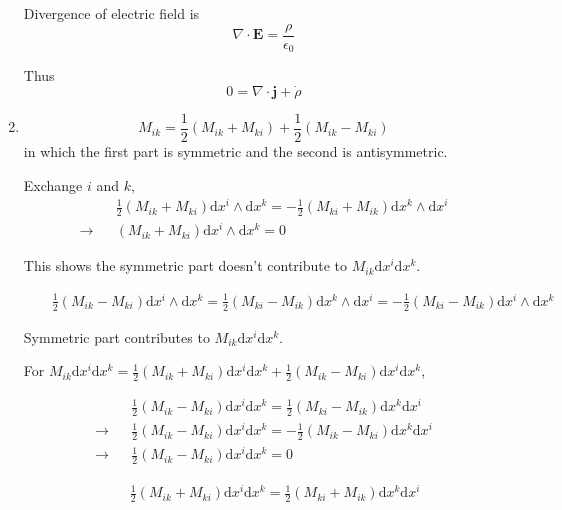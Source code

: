 \documentclass[12pt,a4paper]{article}
\begin{document}
\begin{enumerate}
Divergence of electric field is
\begin{equation}
	\nabla\cdot \mathbf E = \frac \rho {\epsilon_0}
\end{equation}

Thus
\begin{equation}
	0 = \nabla\cdot \mathbf j + \dot{\rho}
\end{equation}


\item

\begin{equation}
	M_{ik} = \frac{1}{2}(M_{ik} + M_{ki}) + \frac{1}{2}(M_{ik} - M_{ki})
\end{equation}
in which the first part is symmetric and the second is antisymmetric.

Exchange $i$ and $k$,
\begin{eqnarray}
	&&\frac12 (M_{ik} + M_{ki})\mathrm dx^i\wedge \mathrm dx^k
	= -\frac12(M_{ki} + M_{ik})\mathrm dx^k\wedge \mathrm dx^i \\
	\rightarrow && (M_{ik} + M_{ki})\mathrm dx^i\wedge \mathrm dx^k = 0
\end{eqnarray}

This shows the symmetric part doesn't contribute to $M_{ik}\mathrm dx^i\mathrm dx^k$.

\begin{eqnarray}
	&&\frac12 (M_{ik} - M_{ki})\mathrm dx^i\wedge \mathrm dx^k
	= \frac12(M_{ki} - M_{ik})\mathrm dx^k\wedge \mathrm dx^i 
	= -\frac12(M_{ki} - M_{ik})\mathrm dx^i\wedge \mathrm dx^k
\end{eqnarray}

Symmetric part contributes to $M_{ik}\mathrm dx^i\mathrm dx^k$.


For $M_{ik} \mathrm dx^i\mathrm dx^k = \frac{1}{2}(M_{ik} + M_{ki})\mathrm dx^i\mathrm dx^k + \frac{1}{2}(M_{ik} - M_{ki})\mathrm dx^i\mathrm dx^k$,

\begin{eqnarray}
	&&\frac12 (M_{ik} - M_{ki})\mathrm dx^i \mathrm dx^k
	= \frac12(M_{ki} - M_{ik})\mathrm dx^k \mathrm dx^i \\
	\rightarrow && \frac12 (M_{ik} - M_{ki})\mathrm dx^i \mathrm dx^k
	= - \frac12(M_{ik} - M_{ki})\mathrm dx^k \mathrm dx^i \\
	\rightarrow && \frac12 (M_{ik} - M_{ki})\mathrm dx^i \mathrm dx^k =0
\end{eqnarray}


\begin{eqnarray}
	&&\frac12 (M_{ik} + M_{ki})\mathrm dx^i \mathrm dx^k
	= \frac12(M_{ki} + M_{ik})\mathrm dx^k \mathrm dx^i
\end{eqnarray}


\end{enumerate}
\end{document}
